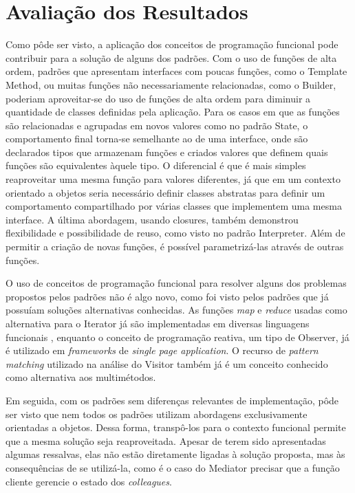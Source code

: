 \section{Avaliação dos Resultados}

Como pôde ser visto, a aplicação dos 
conceitos de programação funcional pode 
contribuir para a solução de alguns dos padrões. 
Com o uso de funções de alta ordem, padrões 
que apresentam interfaces com poucas funções, como o 
Template Method, ou muitas funções 
não necessariamente relacionadas, como 
o Builder, poderiam aproveitar-se do 
uso de funções de alta ordem para diminuir a 
quantidade de classes definidas pela 
aplicação. Para os casos em que as funções 
são relacionadas e agrupadas em 
novos valores como no padrão State, 
o comportamento final torna-se semelhante 
ao de uma interface, onde são declarados 
tipos que armazenam funções e criados 
valores que definem quais funções são 
equivalentes àquele tipo. 
O diferencial é que 
é mais simples reaproveitar uma mesma 
função para valores diferentes, já que 
em um contexto orientado a objetos seria 
necessário definir classes abstratas 
para definir um comportamento compartilhado 
por várias classes que implementem uma 
mesma interface.
A última abordagem, usando closures, também 
demonstrou flexibilidade e possibilidade 
de reuso, como visto no padrão Interpreter. 
Além de permitir a criação de novas funções, 
é possível parametrizá-las através de 
outras funções.

O uso de conceitos de programação funcional 
para resolver alguns dos problemas propostos 
pelos padrões não é algo novo, como foi visto 
pelos padrões que já possuíam soluções alternativas 
conhecidas. As funções \textit{map} e \textit{reduce} 
usadas como alternativa para o Iterator já 
são implementadas em diversas linguagens funcionais
\cite{realworldhaskell,wampler2021,braveclojure}, 
enquanto o conceito de programação reativa, 
um tipo de Observer, já é 
utilizado em \textit{frameworks} de  
\textit{single page application}\cite{rxjs}. 
O recurso de \textit{pattern matching} 
utilizado na análise do Visitor também já 
é um conceito conhecido como alternativa 
aos multimétodos\cite{patternmatchingvisitor}.

Em seguida, com os padrões sem diferenças 
relevantes de implementação, pôde ser visto 
que nem todos os padrões utilizam abordagens 
exclusivamente orientadas a objetos. Dessa forma, 
transpô-los para o contexto funcional 
permite que a mesma solução seja reaproveitada. 
Apesar de terem sido apresentadas algumas 
ressalvas, elas não estão diretamente ligadas 
à solução proposta, mas às consequências de 
se utilizá-la, como é o caso do Mediator 
precisar que a função cliente gerencie o 
estado dos \textit{colleagues}. 

